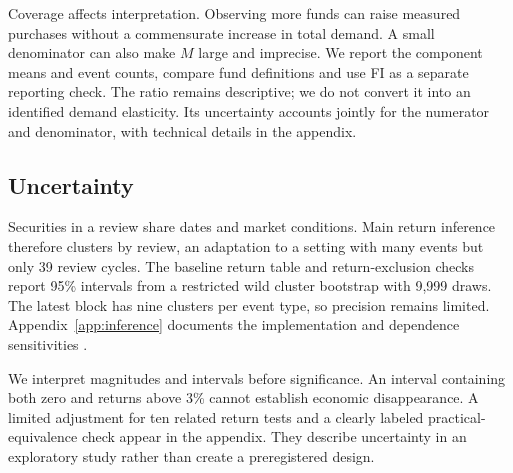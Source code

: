 Coverage affects interpretation. Observing more funds can raise measured purchases without a commensurate increase in total demand. A small denominator can also make $M$ large and imprecise. We report the component means and event counts, compare fund definitions and use FI as a separate reporting check. The ratio remains descriptive; we do not convert it into an identified demand elasticity. Its uncertainty accounts jointly for the numerator and denominator, with technical details in the appendix.

\subsection{Uncertainty}

Securities in a review share dates and market conditions. Main return inference therefore clusters by review, an adaptation to a setting with many events but only 39 review cycles. The baseline return table and return-exclusion checks report 95\% intervals from a restricted wild cluster bootstrap with 9,999 draws. The latest block has nine clusters per event type, so precision remains limited. Appendix~\ref{app:inference} documents the implementation and dependence sensitivities \citep{petersen2009,mackinnon2023}.

We interpret magnitudes and intervals before significance. An interval containing both zero and returns above 3\% cannot establish economic disappearance. A limited adjustment for ten related return tests and a clearly labeled practical-equivalence check appear in the appendix. They describe uncertainty in an exploratory study rather than create a preregistered design.

\FloatBarrier
